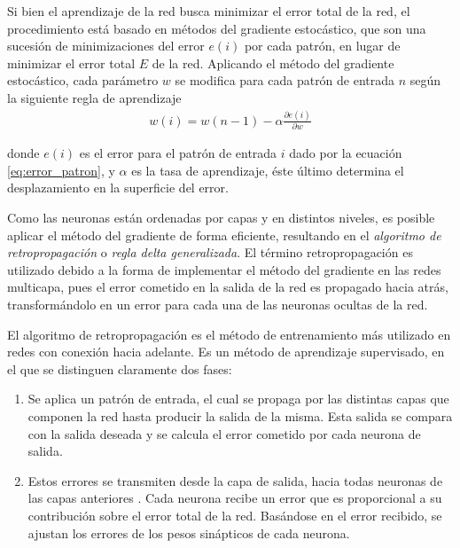 Si bien el aprendizaje de la red busca minimizar el error total de la red, el procedimiento está basado en métodos del gradiente estocástico, que son una sucesión de minimizaciones del error $e(i)$ por cada patrón, en lugar de minimizar el error total $E$ de la red. Aplicando el método del gradiente estocástico, cada parámetro $w$ se modifica para cada patrón de entrada $n$ según la siguiente regla de aprendizaje
\begin{eqnarray}
	w(i) = w(n - 1) - \alpha\frac{\partial e(i)}{\partial w}
\end{eqnarray}

donde $e(i)$ es el error para el patrón de entrada $i$ dado por la ecuación \ref{eq:error_patron}, y $\alpha$ es la tasa de aprendizaje, éste último determina el desplazamiento en la superficie del error.

Como las neuronas están ordenadas por capas y en distintos niveles, es posible aplicar el método del gradiente de forma eficiente, resultando en el {\em algoritmo de retropropagación} \cite{Rumelhart1986} o {\em regla delta generalizada}. El término retropropagación es utilizado debido a la forma de implementar el método del gradiente en las redes multicapa, pues el error cometido en la salida de la red es propagado hacia atrás, transformándolo en un error para cada una de las neuronas ocultas de la red.

El algoritmo de retropropagación es el método de entrenamiento más utilizado en redes con conexión hacia adelante. Es un método de aprendizaje supervisado, en el que se distinguen claramente dos fases:
\begin{enumerate}
	\item Se aplica un patrón de entrada, el cual se propaga por las distintas capas que componen la red hasta producir la salida de la misma. Esta salida se compara con la salida deseada y se calcula el error cometido por cada neurona de salida.

	\item Estos errores se transmiten desde la capa de salida, hacia todas neuronas de las capas anteriores \cite{Fritsch1996}. Cada neurona recibe un error que es proporcional a su contribución sobre el error total de la red. Basándose en el error recibido, se ajustan los errores de los pesos sinápticos de cada neurona.
\end{enumerate}








